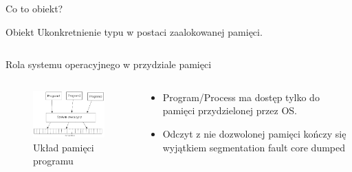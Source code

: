 \documentclass{beamer}
\begin{document}
\begin{frame}[containsverbatim]{Co to obiekt?}

    \begin{block}{Obiekt}
        Ukonkretnienie typu w postaci zaalokowanej pamięci. 
    \end{block}

    \begin{block}{}
    \begin{figure}
        \centering
        \inputminted{cpp}{./cpp_object.cpp}
        \label{fig:cpp-obj-on-stack}
    \end{figure}

    \end{block}
    
\end{frame}

\begin{frame}{Rola systemu operacyjnego w przydziale pamięci}
    \begin{columns}
        \begin{column}{0.58\textwidth} 
            \begin{figure}
                \centering
                \includegraphics[width=7cm]{./os_in_memory_alloc.png}
                \caption{Układ pamięci programu}
                \label{img:os_in_memory_alloc}
            \end{figure}
        \end{column}
        \begin{column}{0.4\textwidth} 
            \begin{itemize}
                    \item Program/Process ma dostęp tylko do pamięci przydzielonej przez OS.
                    \item Odczyt z nie dozwolonej pamięci kończy się wyjątkiem segmentation fault core dumped
            \end{itemize}
        \end{column}
\end{columns}


\end{frame}
\end{document}
